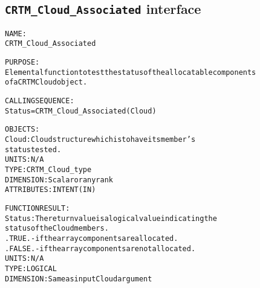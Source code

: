 \subsection{\texttt{CRTM\_Cloud\_Associated} interface}
  \label{sec:CRTM_Cloud_Associated_interface}
  \begin{alltt}
 
  NAME:
        CRTM_Cloud_Associated
 
  PURPOSE:
        Elemental function to test the status of the allocatable components
        of a CRTM Cloud object.
 
  CALLING SEQUENCE:
        Status = CRTM_Cloud_Associated( Cloud )
 
  OBJECTS:
        Cloud:   Cloud structure which is to have its member's
                 status tested.
                 UNITS:      N/A
                 TYPE:       CRTM_Cloud_type
                 DIMENSION:  Scalar or any rank
                 ATTRIBUTES: INTENT(IN)
 
  FUNCTION RESULT:
        Status:  The return value is a logical value indicating the
                 status of the Cloud members.
                   .TRUE.  - if the array components are allocated.
                   .FALSE. - if the array components are not allocated.
                 UNITS:      N/A
                 TYPE:       LOGICAL
                 DIMENSION:  Same as input Cloud argument
 
  \end{alltt}
